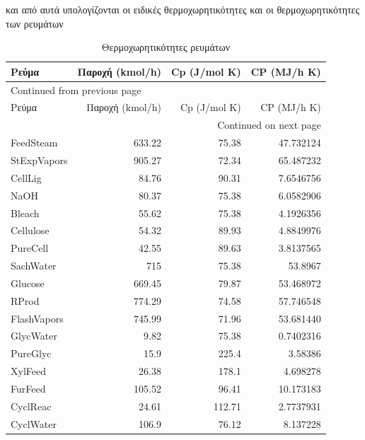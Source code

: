 \documentclass[11pt]{article}
\begin{document}
και από αυτά υπολογίζονται οι ειδικές θερμοχωρητικότητες και οι θερμοχωρητικότητες των ρευμάτων
\begin{longtable}{lrrr}
\caption{Θερμοχωρητικότητες ρευμάτων}
\\
Ρεύμα & Παροχή (kmol/h) & Cp (J/mol K) & CP (MJ/h K)\\
\hline
\endfirsthead
\multicolumn{4}{l}{Continued from previous page} \\
\hline

Ρεύμα & Παροχή (kmol/h) & Cp (J/mol K) & CP (MJ/h K) \\

\hline
\endhead
\hline\multicolumn{4}{r}{Continued on next page} \\
\endfoot
\endlastfoot
\hline
FeedSteam & 633.22 & 75.38 & 47.732124\\
StExpVapors & 905.27 & 72.34 & 65.487232\\
CellLig & 84.76 & 90.31 & 7.6546756\\
NaOH & 80.37 & 75.38 & 6.0582906\\
Bleach & 55.62 & 75.38 & 4.1926356\\
Cellulose & 54.32 & 89.93 & 4.8849976\\
PureCell & 42.55 & 89.63 & 3.8137565\\
SachWater & 715 & 75.38 & 53.8967\\
Glucose & 669.45 & 79.87 & 53.468972\\
RProd & 774.29 & 74.58 & 57.746548\\
FlashVapors & 745.99 & 71.96 & 53.681440\\
GlycWater & 9.82 & 75.38 & 0.7402316\\
PureGlyc & 15.9 & 225.4 & 3.58386\\
XylFeed & 26.38 & 178.1 & 4.698278\\
FurFeed & 105.52 & 96.41 & 10.173183\\
CyclReac & 24.61 & 112.71 & 2.7737931\\
CyclWater & 106.9 & 76.12 & 8.137228\\
\end{longtable}
\end{document}
